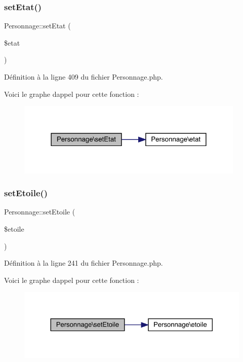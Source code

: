 \subsubsection{\texorpdfstring{set\+Etat()}{setEtat()}}
{\footnotesize\ttfamily Personnage\+::set\+Etat (\begin{DoxyParamCaption}\item[{}]{\$etat }\end{DoxyParamCaption})}



Définition à la ligne 409 du fichier Personnage.\+php.

Voici le graphe d\textquotesingle{}appel pour cette fonction \+:\nopagebreak
\begin{figure}[H]
\begin{center}
\leavevmode
\includegraphics[width=309pt]{class_personnage_af368ea425266209c0dcf800bdfcf1b84_cgraph}
\end{center}
\end{figure}
\mbox{\label{class_personnage_ad45b2c2c30828e3f0e56d563c031235d}} 
\subsubsection{\texorpdfstring{set\+Etoile()}{setEtoile()}}
{\footnotesize\ttfamily Personnage\+::set\+Etoile (\begin{DoxyParamCaption}\item[{}]{\$etoile }\end{DoxyParamCaption})}



Définition à la ligne 241 du fichier Personnage.\+php.

Voici le graphe d\textquotesingle{}appel pour cette fonction \+:\nopagebreak
\begin{figure}[H]
\begin{center}
\leavevmode
\includegraphics[width=324pt]{class_personnage_ad45b2c2c30828e3f0e56d563c031235d_cgraph}
\end{center}
\end{figure}
\mbox{\label{class_personnage_abcc3bdc5236dbfccd50c3dc5db1e8fce}} 
